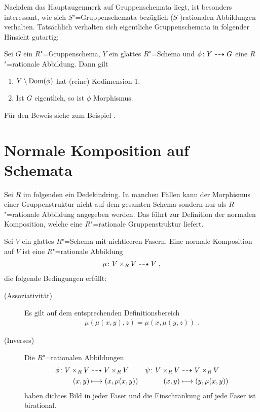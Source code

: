 Nachdem das Hauptaugenmerk auf Gruppenschemata liegt, ist
besonders interessant, wie sich $S$"=Gruppenschemata
bezüglich ($S$-)rationalen Abbildungen verhalten.
Tatsächlich verhalten sich eigentliche Gruppenschemata in folgender
Hinsicht gutartig:
\begin{Theorem}
  \label{thm:rationalzumorphismus}
  Sei $G$ ein $R$"=Gruppenschema, $Y$ ein glattes $R$"=Schema und
  $\phi\colon Y\dashrightarrow G$ eine $R$"=rationale Abbildung.
  Dann gilt
  \begin{enumerate}[label=(\alph*)]
  \item $Y\setminus \operatorname{Dom}(\phi)$ hat (reine) Kodimension 1.
  \item Ist $G$ eigentlich, so ist $\phi$ Morphismus.
  \end{enumerate}
\end{Theorem}
Für den Beweis siehe zum Beispiel \cite[Proposition~IV.6.2]{silverman2}.


\section{Normale Komposition auf Schemata}
Sei $R$ im folgenden ein Dedekindring.
In manchen Fällen kann der Morphismus einer Gruppenstruktur nicht auf
dem gesamten Schema sondern nur als $R$"=rationale Abbildung angegeben
werden. Das führt zur Definition der normalen Komposition, welche
eine $R$"=rationale Gruppenstruktur liefert.
\begin{Definition}\label{def:normalekomposition}
  Sei $V$ ein glattes $R$"=Schema mit nichtleeren Fasern.
  Eine normale Komposition auf $V$ ist eine $R$"=rationale
  Abbildung
  \begin{gather*}
    \mu\colon V\times_R V\dashrightarrow V\;,
  \end{gather*}
  die folgende Bedingungen erfüllt:
  \begin{description}
  \item[(Assoziativität)] Es gilt auf dem entsprechenden
    Definitionsbereich
    \begin{gather*}
      \mu(\mu(x,y),z)=\mu(x,\mu(y,z))\;.
    \end{gather*}
  \item[(Inverses)]
    Die $R$"=rationalen Abbildungen
    \begin{align*}
      \phi\colon V\times_R V
      &\dra V\times_R V
      &\psi\colon V\times_R V
      & \dra V\times_R V\\
      (x,y)
      &\longmapsto (x,\mu(x,y))
      &(x,y)
      &\longmapsto (y,\mu(x,y))       
    \end{align*}
    haben dichtes Bild in jeder Faser und die Einschränkung auf jede
    Faser ist birational.
  \end{description}
\end{Definition}

